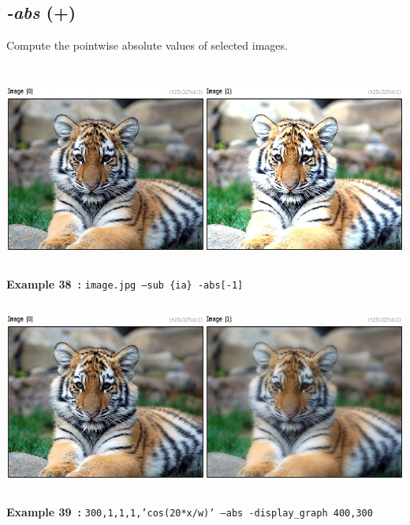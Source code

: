 \documentclass[a4paper,11pt,twoside]{book}
\begin{document}
\subsection{\emph{-abs} (+)}\vspace*{-0.5em}
Compute the pointwise absolute values of selected images.
\begin{center}\includegraphics[keepaspectratio=true,height=7cm,width=\textwidth]{img/gmic_def38.jpg}\\
{\footnotesize \textbf{Example 38~:} \texttt{image.jpg --sub \{ia\} -abs[-1]}}
\\\includegraphics[keepaspectratio=true,height=7cm,width=\textwidth]{img/gmic_def39.jpg}\\
{\footnotesize \textbf{Example 39~:} \texttt{300,1,1,1,'cos(20*x/w)' --abs -display\_graph 400,300}}
\end{center}
\end{document}
